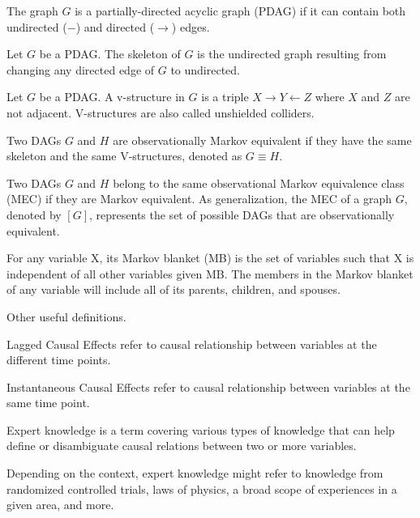 \begin{definition}[PDAG]
    The graph $G$ is a partially-directed acyclic graph (PDAG) if it can contain both undirected ($-$) and directed ($\rightarrow$) edges.
\end{definition}
\begin{definition}[Skeleton]
    Let $G$ be a PDAG. The skeleton of $G$ is the undirected graph resulting from changing any directed edge of $G$ to undirected.
\end{definition}
\begin{definition}[V-structure]
    Let $G$ be a PDAG. A v-structure in $G$ is a triple $X \rightarrow Y \leftarrow Z$ where $X$ and $Z$ are not adjacent. V-structures are also called unshielded colliders.
\end{definition}
\begin{definition}
    Two DAGs $G$ and $H$ are observationally Markov equivalent if they have the same skeleton and the same V-structures, denoted as $G \equiv H$.
\end{definition}
\begin{definition}
    Two DAGs $G$ and $H$ belong to the same observational Markov equivalence class (MEC) if they are Markov equivalent. As generalization, the MEC of a graph $G$, denoted by $[G]$, represents the set of possible DAGs that are observationally equivalent.
\end{definition}
\begin{definition}
    For any variable X, its Markov blanket (MB) is the set of variables such that X is independent of all other variables given MB. The members in the Markov blanket of any variable will include all of its parents, children, and spouses.
\end{definition}

Other useful definitions.

\begin{definition}
    Lagged Causal Effects refer to causal relationship between variables at the different time points.
\end{definition}
\begin{definition}
    Instantaneous Causal Effects refer to causal relationship between variables at the same time point.
\end{definition}
\begin{definition}
    Expert knowledge is a term covering various types of knowledge that can help define or disambiguate causal relations between two or more variables.
\end{definition}
Depending on the context, expert knowledge might refer to knowledge from randomized controlled trials, laws of physics, a broad scope of experiences in a given area, and more.\\

